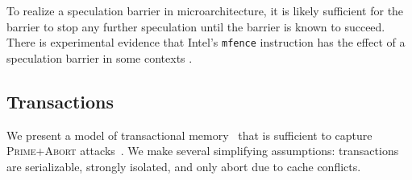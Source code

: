 \documentclass[conference]{IEEEtran}
\theoremstyle{plain}
\theoremstyle{definition}
\begin{document}
To realize a speculation barrier in microarchitecture, it is likely
sufficient for the barrier to stop any further speculation until the barrier
is known to succeed.  There is experimental evidence that Intel's
\texttt{mfence} instruction has the effect of a speculation barrier in some contexts
\cite[\S{VII-\textit{D}}]{DBLP:conf/micro/TrippelLM18}.

\subsection{Transactions}
\label{sec:transactions}

We present a model of transactional memory~\cite{Larus:2007:TM:1207012} that is sufficient to capture
\textsc{Prime+Abort} attacks~\cite{DBLP:conf/uss/DisselkoenKPT17}.  We make
several simplifying assumptions: transactions are serializable, strongly
isolated, and only abort due to cache conflicts.
\end{document}
